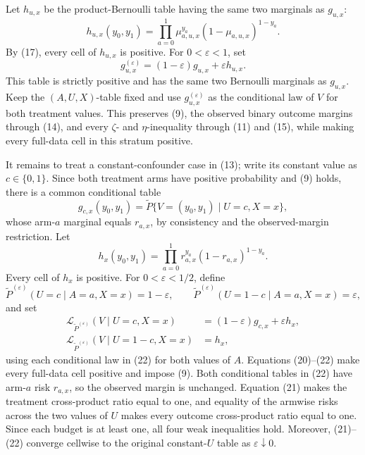 Let \(h_{u,x}\) be the product-Bernoulli table having the same two marginals as \(g_{u,x}\):
\[
h_{u,x}(y_0,y_1)
=\prod_{a=0}^1
 \mu_{a,u,x}^{y_a}(1-\mu_{a,u,x})^{1-y_a}.               \tag{18}
\]
By (17), every cell of \(h_{u,x}\) is positive.  For \(0<\varepsilon<1\), set
\[
g_{u,x}^{(\varepsilon)}
=(1-\varepsilon)g_{u,x}+\varepsilon h_{u,x}.             \tag{19}
\]
This table is strictly positive and has the same two Bernoulli marginals as \(g_{u,x}\).  Keep the \((A,U,X)\)-table fixed and use \(g_{u,x}^{(\varepsilon)}\) as the conditional law of \(V\) for both treatment values.  This preserves (9), the observed binary outcome margins through (14), and every \(\zeta\)- and \(\eta\)-inequality through (11) and (15), while making every full-data cell in this stratum positive.

It remains to treat a constant-confounder case in (13); write its constant value as \(c\in\{0,1\}\).  Since both treatment arms have positive probability and (9) holds, there is a common conditional table
\[
g_{c,x}(y_0,y_1)
=\widetilde P\{V=(y_0,y_1)\mid U=c,X=x\},
\]
whose arm-\(a\) marginal equals \(r_{a,x}\), by consistency and the observed-margin restriction.  Let
\[
h_x(y_0,y_1)
=\prod_{a=0}^1 r_{a,x}^{y_a}(1-r_{a,x})^{1-y_a}.          \tag{20}
\]
Every cell of \(h_x\) is positive.  For \(0<\varepsilon<1/2\), define
\[
\widetilde P^{(\varepsilon)}(U=c\mid A=a,X=x)=1-\varepsilon,
\qquad
\widetilde P^{(\varepsilon)}(U=1-c\mid A=a,X=x)=\varepsilon, \tag{21}
\]
and set
\[
\begin{aligned}
\mathcal L_{\widetilde P^{(\varepsilon)}}(V\mid U=c,X=x)
&=(1-\varepsilon)g_{c,x}+\varepsilon h_x,\\
\mathcal L_{\widetilde P^{(\varepsilon)}}(V\mid U=1-c,X=x)
&=h_x,
\end{aligned}                                             \tag{22}
\]
using each conditional law in (22) for both values of \(A\).  Equations (20)--(22) make every full-data cell positive and impose (9).  Both conditional tables in (22) have arm-\(a\) risk \(r_{a,x}\), so the observed margin is unchanged.  Equation (21) makes the treatment cross-product ratio equal to one, and equality of the armwise risks across the two values of \(U\) makes every outcome cross-product ratio equal to one.  Since each budget is at least one, all four weak inequalities hold.  Moreover, (21)--(22) converge cellwise to the original constant-\(U\) table as \(\varepsilon\downarrow0\).

